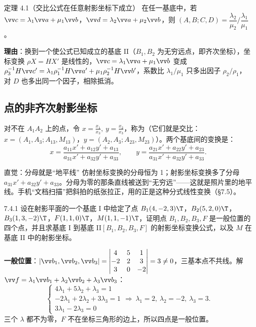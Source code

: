 \begin{thmbox}{定理 4.1（交比公式在任意射影坐标下成立）}
在任一基底中，若 $\vv c=\lambda_1\vv a+\mu_1\vv b$，$\vv d=\lambda_2\vv a+\mu_2\vv b$，则 $(A,B;C,D)=\dfrac{\lambda_2}{\mu_2}\Big/\dfrac{\lambda_1}{\mu_1}$。
\end{thmbox}
\noindent\textbf{理由}：换到一个使公式已知成立的基底 II（$B_1,B_2$ 为无穷远点，即齐次坐标），坐标变换 $\rho X=HX'$ 是线性的，$\vv c=\lambda_1\vv a+\mu_1\vv b$ 变成 $\rho_3^{-1}H\vv c'=\lambda_1\rho_1^{-1}H\vv a'+\mu_1\rho_2^{-1}H\vv b'$，系数比 $\lambda_1/\mu_1$ 只多出因子 $\rho_2/\rho_1$，对 $D$ 也多出同一个因子，相除抵消。

\subsection{点的非齐次射影坐标}
对不在 $A_1A_2$ 上的点，令 $x=\frac{x_1}{x_3},\ y=\frac{x_2}{x_3}$，称为（它们就是交比：$x=(A_1,A_3;A_{13},M_{13})$，$y=(A_2,A_3;A_{23},M_{23})$）。两个基底间的变换是：
\begin{equation}
x=\frac{a_{11}x'+a_{12}y'+a_{13}}{a_{31}x'+a_{32}y'+a_{33}},\qquad
y=\frac{a_{21}x'+a_{22}y'+a_{23}}{a_{31}x'+a_{32}y'+a_{33}}.
\end{equation}

\begin{intbox}{直觉：分母就是“地平线”}
仿射坐标变换的分母恒为 1；射影坐标变换多了分母 $a_{31}x'+a_{32}y'+a_{33}$。分母为零的那条直线被送到“无穷远”——这就是照片里的地平线。手机“文档扫描”把斜拍的纸张拉正，用的正是这种分式线性变换（\S7.5）。
\end{intbox}


\begin{ex}{7.4.1}
设在射影平面的一个基底 I 中给定了点 $B_1(4,-2,3)\T$，$B_2(5,2,0)\T$，$B_3(1,3,-2)\T$，$F(1,1,0)\T$，$M(1,1,-1)\T$，证明点 $B_1,B_2,B_3,F$ 是一般位置的四个点，并且求基底 I 到基底 II$[B_1,B_2,B_3,F]$ 的射影坐标变换公式，以及 $M$ 在基底 II 中的射影坐标。
\end{ex}
\jie \textbf{一般位置}：$|\vv b_1,\vv b_2,\vv b_3|=\begin{vmatrix}4&5&1\\-2&2&3\\3&0&-2\end{vmatrix}=3\neq0$，三基本点不共线。解 $\vv f=\lambda_1\vv b_1+\lambda_2\vv b_2+\lambda_3\vv b_3$：
\[
\begin{cases}4\lambda_1+5\lambda_2+\lambda_3=1\\-2\lambda_1+2\lambda_2+3\lambda_3=1\\3\lambda_1-2\lambda_3=0\end{cases}
\Rightarrow\ \lambda_1=2,\ \lambda_2=-2,\ \lambda_3=3 .
\]
三个 $\lambda$ 都不为零，$F$ 不在坐标三角形的边上，所以四点是一般位置。

